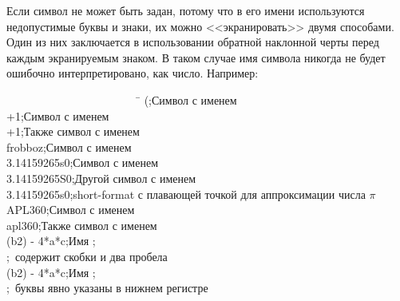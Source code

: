 Если символ не может быть задан, потому что в его имени используются
недопустимые буквы и знаки, их можно <<экранировать>> двумя способами. Один из
них заключается в использовании обратной наклонной черты перед каждым
экранируемым знаком. В таком случае имя символа никогда не будет ошибочно
интерпретировано, как число.
Например:
\begin{lisp}
~~~~~~~~~~~~~~~~~~~~~~~~\=\kill
{\Xbackslash}(\>;\textrm{Символ с именем \cd{(}} \\
{\Xbackslash}+1\>;\textrm{Символ с именем } \\
+{\Xbackslash}1\>;\textrm{Также символ с именем } \\
{\Xbackslash}frobboz\>;\textrm{Символ с именем } \\
3.14159265{\Xbackslash}s0\>;\textrm{Символ с именем } \\
3.14159265{\Xbackslash}S0\>;\textrm{Другой символ с именем } \\
3.14159265s0\>;\textrm{short-format с плавающей точкой для аппроксимации числа $\pi$} \\
APL{\Xbackslash}{\Xbackslash}360\>;\textrm{Символ с именем } \\
apl{\Xbackslash}{\Xbackslash}360\>;\textrm{Также символ с именем } \\
{\Xbackslash}(b{\Xcircumflex}2{\Xbackslash}){\Xbackslash} -{\Xbackslash} 4*a*c\>;\textrm{Имя ;} \\
\>;~\textrm{содержит скобки и два пробела} \\
{\Xbackslash}({\Xbackslash}b{\Xcircumflex}2{\Xbackslash}){\Xbackslash} -{\Xbackslash} 4*{\Xbackslash}a*{\Xbackslash}c\>;\textrm{Имя ;} \\
\>;~\textrm{буквы явно указаны в нижнем регистре}
\end{lisp}

